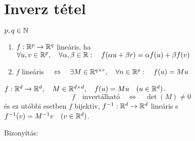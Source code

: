 \documentclass[a4paper,11.5pt]{article}
\begin{document}
	\section{Inverz tétel}
	\begin{revision}
		$p,q\in\mathbb{N}$
		\begin{enumerate}
			\item $f:\mathbb{R}^p\to\mathbb{R}^q$ lineáris, ha $\forall u,v\in\mathbb{R}^p,\quad \forall\alpha,\beta\in\mathbb{R}:\quad f(\alpha u+\beta r)=\alpha f(u)+\beta f(v)$
			\item $f$ lineáris $\quad \Leftrightarrow\quad \exists M\in\mathbb{R}^{q\times r},\quad \forall n\in\mathbb{R}^p:\quad f(u)=Mu$
		\end{enumerate}
	\end{revision}
	\begin{theorem}
		$f:\mathbb{R}^d\to\mathbb{R}^d,\quad M\in\mathbb{R}^{d\times d},\quad f(u)=Mu\quad (u\in\mathbb{R}^d)$.
		\[ f \quad \text{invertálható}\quad \Leftrightarrow\quad \det(M)\not=0 \]
		és ez utóbbi esetben $f$ bijektív, $f^{-1}:\mathbb{R}^d\to\mathbb{R}^d$ lineáris s $f^{-1}(v)=M^{-1}v\quad (v\in\mathbb{R}^d)$.
		
		Bizonyítás: %
	\end{theorem}
\end{document}
